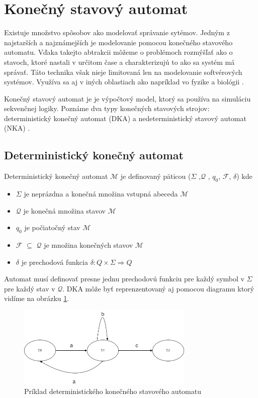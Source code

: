 \section{Konečný stavový automat}
\noindent Existuje množstvo spôsobov ako modelovať správanie sytémov. Jedným z 
najstarších a najznámejších je modelovanie pomocou konečného stavového automatu.
Vďaka takejto abtrakcii môžeme o problémoch rozmýšľať ako o stavoch, ktoré nastali v určitom čase a charakterizujú to ako sa systém má správať. Táto technika však nieje limitovaná len na modelovanie softvérových systémov. Využíva sa aj v iných oblastiach ako napríklad vo fyzike a biológii \cite{WaybackMachine2014}. \par 
Konečný stavový automat je je výpočtový model, ktorý sa používa na simuláciu sekvenčnej logiky. Poznáme dva typy konečných stavových strojov: deterministický konečný automat (DKA)  a nedeterministický stavový automat (NKA) \cite{FiniteStateMachines}. 

\subsection{Deterministický konečný automat}
\noindent Deterministický konečný automat $\mathcal{M}$ je definovaný päticou ($\Sigma$ ,$\mathcal{Q}$ , $q_0$, $\mathcal{F}$, $\delta$) kde
\begin{itemize}
    \item $\Sigma$ je neprázdna a konečná množina vstupná abeceda $\mathcal{M}$
    \item $\mathcal{Q}$ je konečná množina stavov $\mathcal{M}$
    \item $q_0$ je počiatočný stav $\mathcal{M}$
    \item $\mathcal{F}$ $\subseteq$ $\mathcal{Q}$ je množina konečných stavov $\mathcal{M}$
    \item $\delta$ je prechodová funkcia  \begin{math}\delta : Q \times \Sigma \Rightarrow Q\end{math}
\end{itemize}

Automat musí definovať presne jednu prechodovú funkciu pre každý symbol v $\Sigma$ pre každý stav v $\mathcal{Q}$. DKA môže byť reprenzentovaný aj pomocou diagramu ktorý vidíme na obrázku \ref{dfa1}.

\begin{figure}[h]
    \centering
    \includegraphics[width=0.75\textwidth]{img/dfa.png}
    \caption{Príklad deterministického konečného stavového automatu}
    \label{dfa1}
\end{figure}

